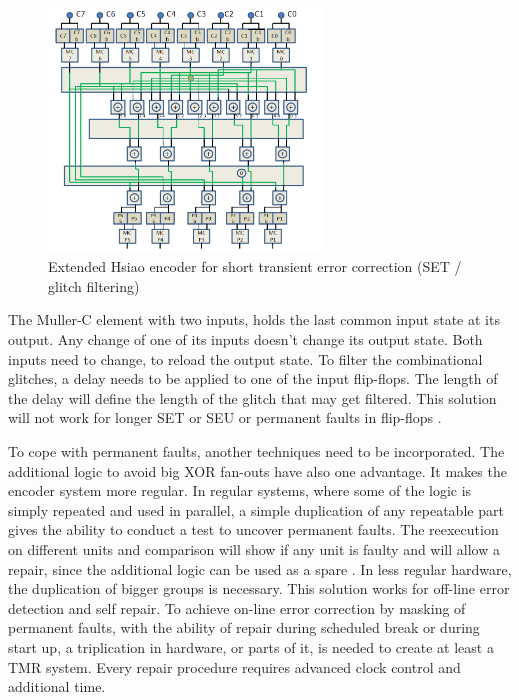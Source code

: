 \begin{figure}[h]
\centering
\includegraphics[width=0.65\textwidth]{figures/Hsiao.png}
\caption{Extended Hsiao encoder for short transient error correction (SET / glitch filtering) \cite{art:Dicorato}}
\label{fig:Hsiao}
\end{figure}

The Muller-C element with two inputs, holds the last common input state at its output. Any change of one of its inputs doesn't change its output state. Both inputs need to change, to reload the output state. To filter the combinational glitches, a delay needs to be applied to one of the input flip-flops. The length of the delay will define the length of the glitch that may get filtered. This solution will not work for longer SET or SEU or permanent faults in flip-flops \cite{4,5}.

To cope with permanent faults, another techniques need to be incorporated. The additional logic to avoid big XOR fan-outs have also one advantage. It makes the encoder system more regular. In regular systems, where some of the logic is simply repeated and used in parallel, a simple duplication of any repeatable part gives the ability to conduct a test to uncover permanent faults. The reexecution on different units and comparison will show if any unit is faulty and will allow a repair, since the additional logic can be used as a spare \cite{art:Dicorato}. In less regular hardware, the duplication of bigger groups is necessary. This solution works for off-line error detection and self repair. To achieve on-line error correction by masking of permanent faults, with the ability of repair during scheduled break or during start up, a triplication in hardware, or parts of it, is needed to create at least a TMR system. Every repair procedure requires advanced clock control and additional time.

